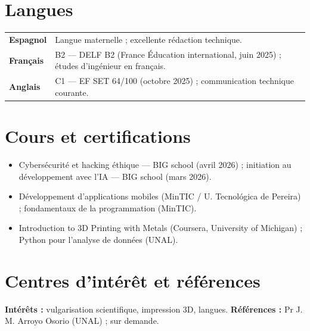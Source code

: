 \documentclass[10pt,a4paper]{article}
\newenvironment{points}{\begin{itemize}[leftmargin=1.1em,itemsep=1pt,topsep=2pt,parsep=0pt,label=\textcolor{navy}{\scriptsize$\blacksquare$}]\small}{\end{itemize}}
\begin{document}
\section{Langues}
{\small
\begin{tabularx}{\linewidth}{@{}>{\bfseries}p{3.6cm}X@{}}
Espagnol & Langue maternelle ; excellente rédaction technique. \\
Français & B2 — DELF B2 (France Éducation international, juin 2025) ; études d'ingénieur en français. \\
Anglais & C1 — EF SET 64/100 (octobre 2025) ; communication technique courante. \\
\end{tabularx}}

\section{Cours et certifications}
\begin{points}
  \item Cybersécurité et hacking éthique — BIG school (avril 2026) ; initiation au développement avec l'IA — BIG school (mars 2026).
  \item Développement d'applications mobiles (MinTIC / U. Tecnológica de Pereira) ; fondamentaux de la programmation (MinTIC).
  \item Introduction to 3D Printing with Metals (Coursera, University of Michigan) ; Python pour l'analyse de données (UNAL).
\end{points}

\section{Centres d'intérêt et références}
{\small
\textbf{Intérêts :} vulgarisation scientifique, impression 3D, langues. \quad \textbf{Références :} Pr J. M. Arroyo Osorio (UNAL) ; sur demande.}
\end{document}
